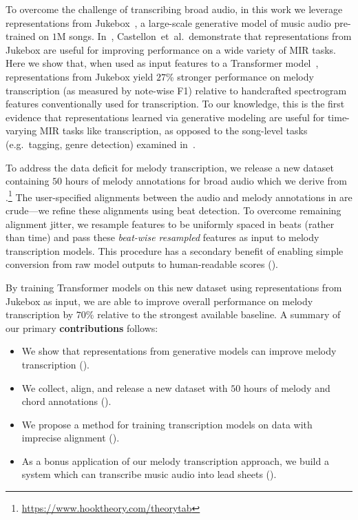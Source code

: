 To overcome the challenge of transcribing broad audio, in this work we leverage representations from Jukebox~\cite{dhariwal2020jukebox}, a large-scale generative model of music audio pre-trained on $1$M songs. 
In~\cite{castellon2021calm}, Castellon~et~al.\ demonstrate that representations from Jukebox are useful for improving performance on a wide variety of MIR tasks. 
Here we show that, when used as input features to a Transformer model~\cite{vaswani2017attention}, representations from Jukebox yield 
$27$\% stronger performance on melody transcription (as measured by note-wise F1) relative to handcrafted spectrogram features conventionally used for transcription. 
To our knowledge, this is the first evidence that representations learned via generative modeling are useful for time-varying MIR tasks like transcription, as opposed to the song-level tasks (e.g.~tagging, genre detection) examined in~\cite{castellon2021calm}.

To address the data deficit for melody transcription, 
we release a new dataset containing $50$ hours of melody annotations for broad audio 
which we derive 
from \hooktheory.\footnote{\url{https://www.hooktheory.com/theorytab}} 
The user-specified alignments between the audio and melody annotations in \hooktheory{} are crude---we refine these alignments using beat detection. 
To overcome remaining alignment jitter, we resample features to be uniformly spaced in beats (rather than time) and pass these \emph{beat-wise resampled} features as input to melody transcription models. 
This procedure 
has a secondary benefit of enabling simple conversion from raw model outputs to human-readable scores ().

By training Transformer models on this new dataset using representations from Jukebox as input, we are able to improve overall performance on melody transcription by 
$70$\% relative 
to the strongest available baseline. 
A summary of our primary \textbf{contributions} follows:
\begin{itemize}
    \item We show that representations from generative models can improve melody transcription ().
    \item We collect, align, and release a new dataset with $50$ hours of melody and chord annotations ().
    \item We propose a method for training transcription models on data with imprecise alignment ().
    \item As a bonus application of our melody transcription approach, we build a system which can transcribe music audio into lead sheets ().
\end{itemize}